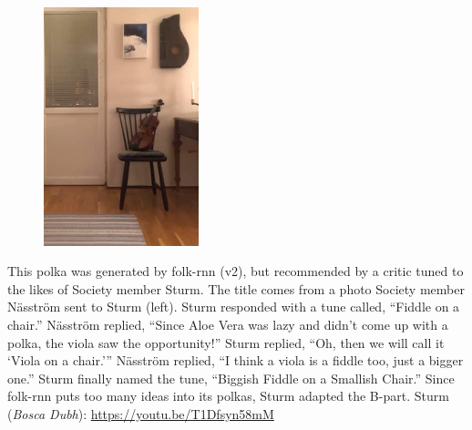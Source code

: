\documentclass[a4paper,notitlepage,twoside]{book}
\begin{document}
{}  
  
\hypertarget{polka:BiggishFiddle}{}
\begin{figure}
\includegraphics[width=0.4\textwidth]{BiggishFiddle.jpg}
\end{figure}
This polka was generated by folk-rnn (v2), but recommended by
a critic tuned to the likes of Society member Sturm.
The title comes from a photo Society member Näsström sent to Sturm (left).
Sturm responded with a tune called, ``Fiddle on a chair.''
Näsström replied, ``Since Aloe Vera was lazy and didn’t come up with a polka, 
the viola saw the opportunity!''
Sturm replied, ``Oh, then we will call it `Viola on a chair.'''
Näsström replied, ``I think a viola is a fiddle too, just a bigger one.''
Sturm finally named the tune, ``Biggish Fiddle on a Smallish Chair.''
Since folk-rnn puts too many ideas into its polkas, 
Sturm adapted the B-part.
Sturm ({\em Bosca Dubh}): \url{https://youtu.be/T1Dfsyn58mM}

\clearpage
\end{document}
